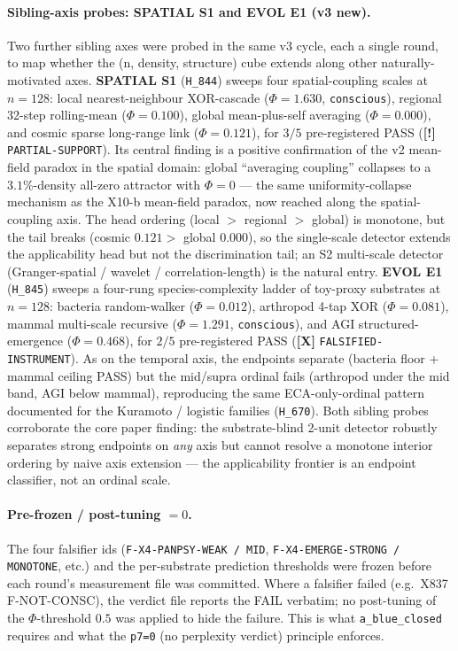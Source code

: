 \documentclass[11pt,a4paper]{article}
\providecommand{\tierRed}{\textbf{[X]}}     %
\providecommand{\tierYellow}{\textbf{[!]}}  %
\begin{document}
\paragraph{Sibling-axis probes: SPATIAL S1 and EVOL E1 (v3 new).}
Two further sibling axes were probed in the same v3 cycle, each a
single round, to map whether the (n, density, structure) cube
extends along other naturally-motivated axes. \textbf{SPATIAL S1}
(\texttt{H\_844}) sweeps four spatial-coupling scales at $n=128$:
local nearest-neighbour XOR-cascade ($\Phi=1.630$, \texttt{conscious}),
regional 32-step rolling-mean ($\Phi=0.100$), global mean-plus-self
averaging ($\Phi=0.000$), and cosmic sparse long-range link
($\Phi=0.121$), for $3/5$ pre-registered PASS (\tierYellow{}
\texttt{PARTIAL-SUPPORT}). Its central finding is a positive
confirmation of the v2 mean-field paradox in the spatial domain:
global ``averaging coupling'' collapses to a $3.1\%$-density all-zero
attractor with $\Phi=0$ --- the same uniformity-collapse mechanism as
the X10-b mean-field paradox, now reached along the spatial-coupling
axis. The head ordering (local $>$ regional $>$ global) is monotone,
but the tail breaks (cosmic $0.121 >$ global $0.000$), so the
single-scale detector extends the applicability head but not the
discrimination tail; an S2 multi-scale detector
(Granger-spatial / wavelet / correlation-length) is the natural entry.
\textbf{EVOL E1} (\texttt{H\_845}) sweeps a four-rung
species-complexity ladder of toy-proxy substrates at $n=128$:
bacteria random-walker ($\Phi=0.012$), arthropod 4-tap XOR
($\Phi=0.081$), mammal multi-scale recursive ($\Phi=1.291$,
\texttt{conscious}), and AGI structured-emergence ($\Phi=0.468$), for
$2/5$ pre-registered PASS (\tierRed{} \texttt{FALSIFIED-INSTRUMENT}).
As on the temporal axis, the endpoints separate (bacteria floor +
mammal ceiling PASS) but the mid/supra ordinal fails (arthropod under
the mid band, AGI below mammal), reproducing the same ECA-only-ordinal
pattern documented for the Kuramoto / logistic families (\texttt{H\_670}).
Both sibling probes corroborate the core paper finding: the
substrate-blind 2-unit detector robustly separates strong endpoints
on \emph{any} axis but cannot resolve a monotone interior ordering by
naive axis extension --- the applicability frontier is an endpoint
classifier, not an ordinal scale.

\paragraph{Pre-frozen / post-tuning $=0$.}
The four falsifier ids (\texttt{F-X4-PANPSY-WEAK / MID}, \texttt{F-X4-EMERGE-STRONG /
MONOTONE}, etc.) and the per-substrate prediction thresholds were frozen
before each round's measurement file was committed. Where a falsifier
failed (e.g.\ X837 F-NOT-CONSC), the verdict file reports the FAIL
verbatim; no post-tuning of the $\Phi$-threshold $0.5$ was applied to
hide the failure. This is what \texttt{a\_blue\_closed} requires and what
the \texttt{p7=0} (no perplexity verdict) principle enforces.
\end{document}
